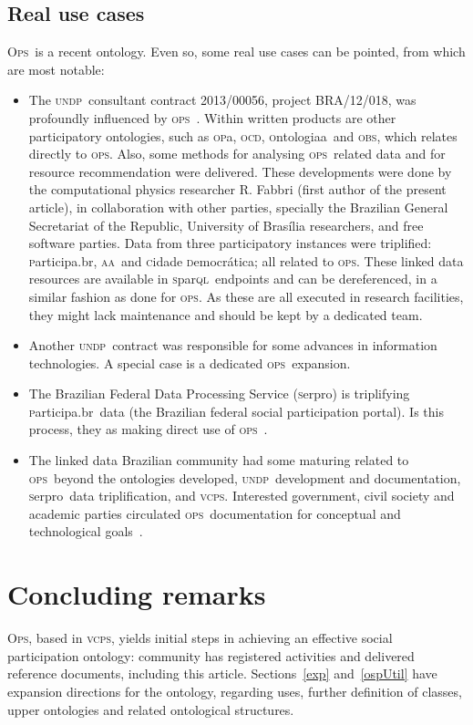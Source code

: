 \documentclass[10pt,letterpaper]{article}
\newcommand{\ops}{\textsc{ops}}
\newcommand{\opsi}{O\textsc{ps}}
\newcommand{\vcps}{\textsc{vcps}}
\newcommand{\sparql}{\textsc{s}par\textsc{ql}}
\newcommand{\opa}{\textsc{op}a}
\newcommand{\ocd}{\textsc{ocd}}
\newcommand{\ontologiaa}{\textsc{o}ntologiaa}
\newcommand{\obs}{\textsc{obs}}
\newcommand{\aan}{\textsc{aa}}
\newcommand{\cidadedemocratica}{\textsc{c}idade \textsc{d}emocr\'atica}
\newcommand{\participa}{\textsc{p}articipa.br}
\newcommand{\pnud}{\textsc{undp}}
\newcommand{\serpro}{\textsc{s}erpro}
\begin{document}
\subsection{Real use cases}\label{sec:real}
\opsi\ is a recent ontology. Even so, some real use cases can be pointed, from which are most notable:
\begin{itemize}
    \item The \pnud\ consultant contract 2013/00056, project BRA/12/018, was profoundly influenced by \ops~\cite{pnud5}. Within written products are other participatory ontologies, such as \opa, \ocd, \ontologiaa\ and \obs, which relates directly to \ops. Also, some methods for analysing \ops\ related data and for resource recommendation were delivered. These developments were done by the computational physics researcher R. Fabbri (first author of the present article), in collaboration with other parties, specially the Brazilian General Secretariat of the Republic, University of Bras\'ilia researchers, and free software parties. Data from three participatory instances were triplified: \participa, \aan\ and \cidadedemocratica; all related to \ops. These linked data resources are available in \sparql\ endpoints and can be dereferenced, in a similar fashion as done for \ops. As these are all executed in research facilities, they might lack maintenance and should be kept by a dedicated team.
    \item Another \pnud\ contract was responsible for some advances in information technologies. A special case is a dedicated \ops\ expansion\cite{paulo6}.
    \item The Brazilian Federal Data Processing Service (\serpro) is triplifying \participa\ data (the Brazilian federal social participation portal). Is this process, they as making direct use of \ops~\cite{tripSerpro}.
    \item The linked data Brazilian community had some maturing related to \ops\ beyond the ontologies developed, \pnud\ development and documentation, \serpro\ data triplification, and \vcps. Interested government, civil society and academic parties circulated \ops\ documentation for conceptual and technological goals~\cite{circulaOps1,circulaOps2}.
\end{itemize}

\section{Concluding remarks}\label{conc}
\opsi, based in \vcps,
yields initial steps in achieving an effective social participation ontology: community has registered activities and delivered reference documents, including this article.
Sections~\ref{exp} and~\ref{ospUtil} have expansion directions for the ontology, regarding uses, further definition of classes, upper ontologies and related ontological structures.
\end{document}
